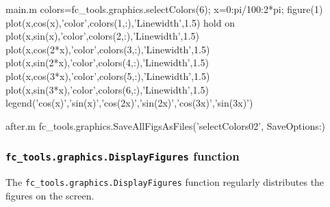 \documentclass[a4paper,10pt]{article}
\newcommand{\fcmcode}[1]{\mbox{{\color{codecolor}\lstinline[breaklines=false]{#1}}}}
\begin{document}
\begin{center}
\end{center}

\begin{filecontents*}{main.m}
colors=fc_tools.graphics.selectColors(6);
x=0:pi/100:2*pi;
figure(1)
plot(x,cos(x),'color',colors(1,:),'Linewidth',1.5)
hold on
plot(x,sin(x),'color',colors(2,:),'Linewidth',1.5)
plot(x,cos(2*x),'color',colors(3,:),'Linewidth',1.5)
plot(x,sin(2*x),'color',colors(4,:),'Linewidth',1.5)
plot(x,cos(3*x),'color',colors(5,:),'Linewidth',1.5)
plot(x,sin(3*x),'color',colors(6,:),'Linewidth',1.5)
legend('cos(x)','sin(x)','cos(2x)','sin(2x)','cos(3x)','sin(3x)')
\end{filecontents*}
\begin{filecontents*}{after.m}
fc_tools.graphics.SaveAllFigsAsFiles('selectColors02', SaveOptions{:})
\end{filecontents*}

\begin{center}
\end{center}




\subsubsection[fc\_tools.graphics.DisplayFigures function]{\fcmcode{fc_tools.graphics.DisplayFigures} function}
The \fcmcode{fc_tools.graphics.DisplayFigures} function regularly distributes the figures on the screen.
\end{document}
